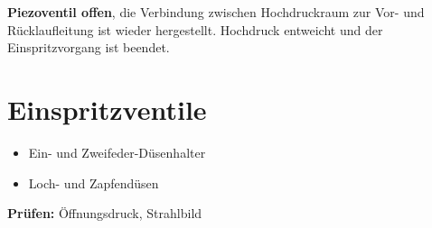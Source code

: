 \textbf{Piezoventil offen}, die Verbindung zwischen Hochdruckraum zur
Vor- und Rücklaufleitung ist wieder hergestellt. Hochdruck entweicht und
der Einspritzvorgang ist beendet.

\section{Einspritzventile}\label{einspritzventile}

\begin{itemize}
\item
  Ein- und Zweifeder-Düsenhalter
\item
  Loch- und Zapfendüsen
\end{itemize}

\textbf{Prüfen:} Öffnungsdruck, Strahlbild
